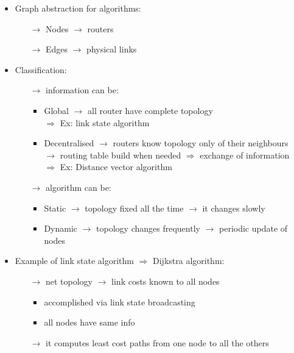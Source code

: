 \begin{itemize}
    \item Graph abstraction for algorithms:
    \begin{itemize}
        \item[$\rightarrow$] Nodes $\rightarrow$ routers
        \item[$\rightarrow$] Edges $\rightarrow$ physical links
    \end{itemize}
    \item Classification:
    \begin{itemize}
        \item[$\rightarrow$] information can be:
        \begin{itemize}
            \item Global $\rightarrow$ all router have complete topology\\
            $\Rightarrow$ Ex: link state algorithm
            \item Decentralised $\rightarrow$ routers know topology only of their neighbours\\
            $\rightarrow$ routing table build when needed $\Rightarrow$ exchange of information\\
            $\Rightarrow$ Ex: Distance vector algorithm
        \end{itemize} 
        \item[$\rightarrow$] algorithm can be:
        \begin{itemize}
            \item Static $\rightarrow$ topology fixed all the time $\rightarrow$ it changes slowly
            \item Dynamic $\rightarrow$ topology changes frequently $\rightarrow$ periodic update of nodes
        \end{itemize}
    \end{itemize}
    \item Example of link state algorithm $\Rightarrow$ Dijkstra algorithm:
    \begin{itemize}
        \item[$\rightarrow$] net topology $\rightarrow$ link costs known to all nodes
        \begin{itemize}
            \item accomplished via link state broadcasting
            \item all nodes have same info
        \end{itemize}
        \item[$\rightarrow$] it computes least cost paths from one node to all the others\\

\end{itemize}
\end{itemize}
